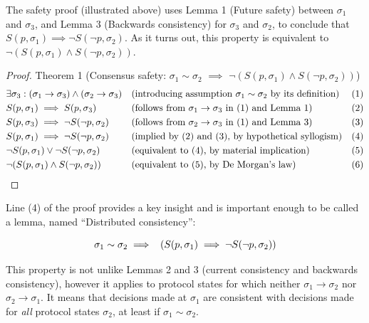 \documentclass{article}
\theoremstyle{definition}
\begin{document}
The safety proof (illustrated above) uses Lemma 1 (Future safety) between $\sigma_1$ and $\sigma_3$, and Lemma 3 (Backwards consistency) for $\sigma_3$ and $\sigma_2$, to conclude that $S(p,\sigma_1) \implies \neg{S(\neg{p},\sigma_2)}$. As it turns out, this property is equivalent to $\neg{(S(p,\sigma_1)\land S(\neg{p},\sigma_2))}$.


\begin{proof}
Theorem 1 (Consensus safety: $\sigma_1 \sim \sigma_2$ $\implies$ $\neg(S(p,\sigma_1) \land S(\neg{p},\sigma_2))$)
\begin{align*}
  &\exists \sigma_3:(\sigma_1 \to \sigma_3) \land (\sigma_2 \to \sigma_3) &&\text{(introducing assumption $\sigma_1 \sim \sigma_2$ by its definition)} &&\text{(1)} \\
  &S(p,\sigma_1) \implies S(p,\sigma_3) &&\text{(follows from $\sigma_1 \to \sigma_3$ in (1) and Lemma 1)} &&\text{(2)} \\
  &S(p,\sigma_3) \implies \neg{S(\neg{p},\sigma_2)} &&\text{(follows from $\sigma_2 \to \sigma_3$ in (1) and Lemma 3)} &&\text{(3)} \\
  &S(p,\sigma_1) \implies \neg{S(\neg{p},\sigma_2)} &&\text{(implied by (2) and (3), by hypothetical syllogism)} &&\text{(4)} \\
  &\neg{S(p,\sigma_1)} \lor \neg{S(\neg{p},\sigma_2)} &&\text{(equivalent to (4), by material implication)} &&\text{(5)} \\
  &\neg(S(p,\sigma_1) \land S(\neg{p},\sigma_2)) \hspace{5mm} \qedhere &&\text{(equivalent to (5), by De Morgan's law)}&&\text{(6)}
\end{align*}
\end{proof}

Line (4) of the proof provides a key insight and is important enough to be called a lemma, named ``Distributed consistency'':
 
\begin{lemma}
$$
\sigma_1 \sim \sigma_2 \implies \hspace{2mm} (S(p,\sigma_1) \implies \neg{S(\neg{p},\sigma_2)})
$$
\end{lemma}

This property is not unlike Lemmas 2 and 3 (current consistency and backwards consistency), however it applies to protocol states for which neither $\sigma_1 \to \sigma_2$ nor $\sigma_2 \to \sigma_1$. It means that decisions made at $\sigma_1$ are consistent with decisions made for \emph{all} protocol states $\sigma_2$, at least if $\sigma_1 \sim \sigma_2$.
\end{document}
